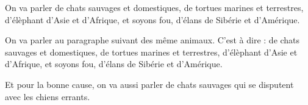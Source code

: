 \documentclass{article}
\begin{document}
\beginnumbering
\autopar

On va parler de 
chats sauvages et domestiques,
de tortues marines et terrestres,
d'élèphant d'Asie et d'Afrique,
et soyons fou, d'élans de Sibérie et d'Amérique.


On va parler au paragraphe suivant des même animaux. C'est à dire : de 
chats sauvages et domestiques,
de tortues marines et terrestres,
d'élèphant d'Asie et d'Afrique,
et soyons fou, d'élans de Sibérie et d'Amérique.

\endnumbering
\newpage
\beginnumbering

\autopar Et pour la bonne cause, on va aussi parler de chats sauvages qui se disputent avec les chiens errants.


\endnumbering

\printindex[animal]
\end{document}
